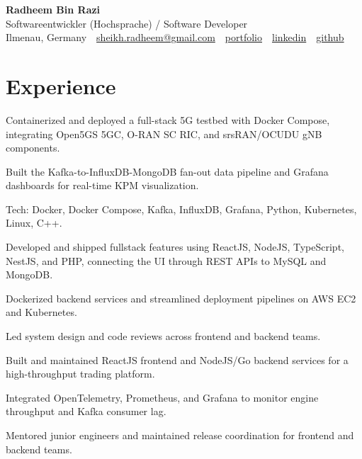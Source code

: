 \documentclass[10pt,a4paper]{resume}
\makeatletter
\newcommand{\Portfolio}{https://radheem.github.io/my-cv}
\newcommand{\PortfolioText}{portfolio}
\newcommand{\GitHub}{https://github.com/radheem}
\newcommand{\LinkedIn}{https://www.linkedin.com/in/radheem-razi}
\newcommand{\Email}{sheikh.radheem@gmail.com}
\makeatother
\begin{document}
\begin{center}
  {\huge\bfseries Radheem Bin Razi}\\[3pt]
  {\large Softwareentwickler (Hochsprache) / Software Developer}\\[6pt]
  \small
  Ilmenau, Germany \,\textbar\,
  \href{mailto:\Email}{\Email} \,\textbar\,
  \href{\Portfolio}{\PortfolioText} \,\textbar\,
  \href{\LinkedIn}{linkedin} \,\textbar\,
  \href{\GitHub}{github}
\end{center}
\vspace{2pt}

\section{Experience}

\bullets
  \item Containerized and deployed a full-stack 5G testbed with Docker Compose, integrating Open5GS 5GC, O-RAN SC RIC, and srsRAN/OCUDU gNB components.
  \item Built the Kafka-to-InfluxDB-MongoDB fan-out data pipeline and Grafana dashboards for real-time KPM visualization.
  \item Tech: Docker, Docker Compose, Kafka, InfluxDB, Grafana, Python, Kubernetes, Linux, C++.
\bulletsend
\vspace{1.5pt}
\bullets
  \item Developed and shipped fullstack features using ReactJS, NodeJS, TypeScript, NestJS, and PHP, connecting the UI through REST APIs to MySQL and MongoDB.
  \item Dockerized backend services and streamlined deployment pipelines on AWS EC2 and Kubernetes.
  \item Led system design and code reviews across frontend and backend teams.
\bulletsend
\vspace{1.5pt}
\bullets
  \item Built and maintained ReactJS frontend and NodeJS/Go backend services for a high-throughput trading platform.
  \item Integrated OpenTelemetry, Prometheus, and Grafana to monitor engine throughput and Kafka consumer lag.
  \item Mentored junior engineers and maintained release coordination for frontend and backend teams.
\bulletsend
\vspace{1.5pt}
\end{document}

